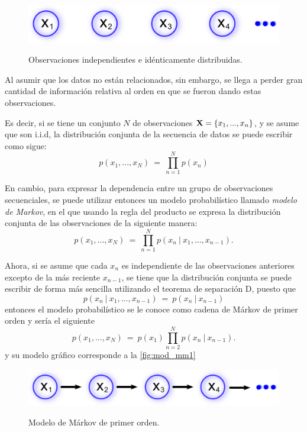 \begin{figure}[bt]
        \myfloatalign
        {\includegraphics[width=0.6\linewidth]{gfx/3-mod-iid}}        
        \caption{Observaciones independientes e idénticamente distribuidas.}
        \label{fig:mod_iid}
\end{figure}

Al asumir que los datos no están relacionados, sin embargo, se llega a perder gran cantidad 
de información relativa al orden en que se fueron dando estas observaciones.

Es decir, si se tiene un conjunto $N$ de observaciones $\textbf{X} = \lbrace x_1, ..., x_n \rbrace$, 
y se asume que son i.i.d, la distribución conjunta de la secuencia de datos se
puede escribir como sigue:
\begin{equation}
\label{eqn:3-1}
p(x_1, ..., x_N) ~=~ \prod_{n=1}^N p(x_n)
\end{equation}

En cambio, para expresar la dependencia entre un grupo de observaciones secuenciales, 
se puede utilizar entonces un modelo probabilístico llamado \textit{modelo de Markov}, 
en el que usando la regla del producto  se expresa 
la distribución conjunta de las observaciones de la siguiente manera:
\begin{equation}
\label{eqn:3-2}
p(x_1, ..., x_N) ~=~ \prod_{n=1}^N p(x_n ~|~ x_1, ..., x_{n-1}).
\end{equation}

Ahora, si se asume que cada $x_n$ es independiente de las observaciones anteriores 
excepto de la más reciente $x_{n-1}$, se tiene que la distribución conjunta se 
puede escribir de forma más sencilla utilizando el teorema de separación D, puesto que 
\begin{equation}
\label{eqn:3-3}
p(x_n ~|~ x_1, ..., x_{n-1}) ~=~ p(x_n ~|~ x_{n-1})
\end{equation}
entonces el modelo probabilístico se le conoce como cadena de Márkov de primer orden 
y sería el siguiente
\begin{equation}
\label{eqn:3-4}
p(x_1, ..., x_N) ~=~ p(x_1) \prod_{n=2}^N p(x_n ~|~ x_{n-1}).
\end{equation}
y su modelo gráfico corresponde a la \autoref{fig:mod_mm1}
\begin{figure}[bt]
        \myfloatalign
        {\includegraphics[width=0.6\linewidth]{gfx/3-mod-mm1}}
        \caption{Modelo de Márkov de primer orden.}
        \label{fig:mod_mm1}
\end{figure}

